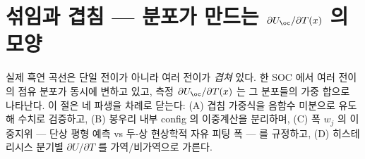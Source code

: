 \section{섞임과 겹침 --- 분포가 만드는 $\partial U_\oc/\partial T(x)$ 의 모양}\label{sec:mixing}

실제 흑연 곡선은 단일 전이가 아니라 여러 전이가 \emph{겹쳐} 있다. 한 SOC 에서 여러 전이의 점유 분포가
동시에 변하고 있고, 측정 $\partial U_\oc/\partial T(x)$ 는 그 분포들의 가중 합으로 나타난다. 이 절은 네 파생을
차례로 닫는다: (A) 겹침 가중식을 음함수 미분으로 유도해 수치로 검증하고, (B) 봉우리 내부 config 의 이중계산을
분리하며, (C) 폭 $w_j$ 의 이중지위 --- 단상 평형 예측 vs 두-상 현상학적 자유 피팅 폭 --- 를 규정하고, (D)
히스테리시스 분기별 $\partial U/\partial T$ 를 가역/비가역으로 가른다.

